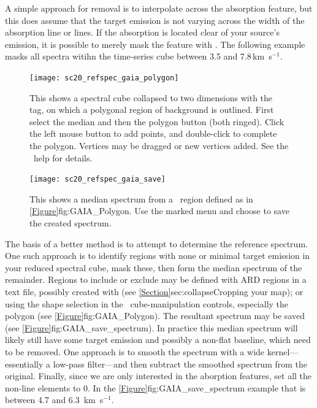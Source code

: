 \documentclass[11pt,oneside,chapters]{starlink}
\newcommand{\kms}{\mbox{$\,$km~s$^{-1}$}}   %
\newcommand{\kms}{\,km~s$^{-1}$}   %
\begin{document}
A simple approach for removal is to interpolate across the absorption
feature, but this does assume that the target emission is not varying
across the width of the absorption line or lines.  If the absorption
is located clear of your source's emission, it is possible to merely
mask the feature with \chpix.  The following example masks all spectra
witihn the time-series cube  between 3.5 and 7.8\kms.

\begin{terminalv}
\end{terminalv}

\begin{figure}[h!] \begin{center}
\texttt{[image: sc20\_refspec\_gaia\_polygon]}
\caption[Using \gaia\ to define background regions]{\label{fig:GAIA_Polygon}
  This shows a spectral cube collapsed to two dimensions with the
   tag, on which a polygonal region of background
  is outlined. First select the median 
  and then the polygon  button (both ringed).
  Click the left mouse button to add points, and double-click to
  complete the polygon.  Vertices may be dragged or new vertices
  added. See the \gaia\ help for details.}
\end{center}
\end{figure}

\begin{figure}[h!] \begin{center}
\texttt{[image: sc20\_refspec\_gaia\_save]}
\caption[Using \gaia\ to define background
regions]{\label{fig:GAIA_save_spectrum}
  This shows a median spectrum from a \gaia\ region defined
  as in \cref{Figure}{fig:GAIA_Polygon}{}.  Use the marked
   menu and choose  to save the
   created spectrum.}
\end{center}
\end{figure}

The basis of a better method is to attempt to determine the reference
spectrum.  One such approach is to identify regions with none or
minimal target emission in your reduced spectral cube, mask these,
then form the median spectrum of the remainder.  Regions to include or
exclude may be defined with ARD regions in a text file, possibly
created with \gaia (see \cref{Section}{sec:collapse}{Cropping your
map}); or using the shape selection in the \gaia\ cube-manipulation
controls, especially the polygon (see
\cref{Figure}{fig:GAIA_Polygon}{}).  The resultant spectrum may be
saved (see \cref{Figure}{fig:GAIA_save_spectrum}{}). In practice this
median spectrum will likely still have some target emission and
possibly a non-flat baseline, which need to be removed. One approach
is to smooth the spectrum with a wide kernel---essentially a low-pass
filter---and then subtract the smoothed spectrum from the original.
Finally, since we are only interested in the aborption features, set
all the non-line elements to 0.  In the
\cref{Figure}{fig:GAIA_save_spectrum}{} example that is between 4.7
and 6.3 \kms.
\end{document}
